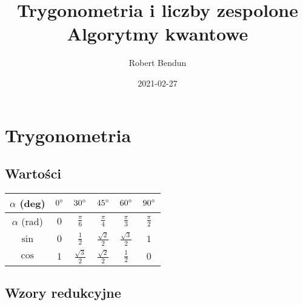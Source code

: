 \documentclass[a5paper,8pt]{extarticle}
\title{Trygonometria i liczby zespolone \\ \large Algorytmy kwantowe}
\date{2021-02-27}
\author{Robert Bendun}
\begin{document}
\maketitle

\section{Trygonometria}

\subsection{Wartości}

\begin{center}
\begin{tabular}{ |c|c|c|c|c|c| } \hline
	$\alpha$ (deg) & $0\degree$ & $30\degree$ & $45\degree$ & $60\degree$ & $90\degree$ \\ \hline
	$\alpha$ (rad) & $0$ & $\frac{\pi}{6}$ & $\frac{\pi}{4}$ & $\frac{\pi}{3}$ & $\frac{\pi}{2}$ \\ \hline
	$\sin$ & $0$ & $\frac{1}{2}$ & $\frac{\sqrt{2}}{2}$ & $\frac{\sqrt{3}}{2}$ & $1$ \\  \hline
	$\cos$ & $1$ & $\frac{\sqrt{3}}{2}$ & $\frac{\sqrt{2}}{2}$ & $\frac{1}{2}$ & $0$ \\ \hline
\end{tabular}
\end{center}

\subsection{Wzory redukcyjne}
\end{document}

